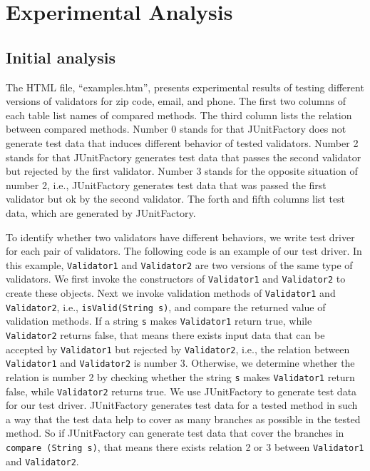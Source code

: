 \section{Experimental Analysis}
\label{Experimental}

\subsection{Initial analysis}

The HTML file, ``examples.htm'',  presents experimental results of testing different versions of validators for zip code, email, and phone. The first two columns of each table list names of compared methods. The third column lists the relation between compared methods. Number 0 stands for that JUnitFactory does not generate test data that induces different behavior of tested validators. Number 2 stands for that JUnitFactory generates test data that passes the second validator but rejected by the first validator. Number 3 stands for the opposite situation of number 2, i.e.,  JUnitFactory generates test data that was passed the first validator but ok by the second validator. The forth and fifth columns list test data, which are generated by JUnitFactory.

To identify whether two validators have different behaviors, we write test driver for each pair of validators. The following code is an example of our test driver. In this example, \verb|Validator1| and \verb|Validator2| are two versions of the same type of validators. We first invoke the constructors of \verb|Validator1| and \verb|Validator2| to create these objects. Next we invoke validation methods of \verb|Validator1| and \verb|Validator2|, i.e., \verb|isValid(String s)|, and compare the returned value of validation methods. If a string \verb|s| makes \verb|Validator1| return true, while  \verb|Validator2| returns false, that means there exists input data that can be accepted by \verb|Validator1| but rejected by \verb|Validator2|, i.e., the relation between \verb|Validator1| and \verb|Validator2| is number 3. Otherwise, we determine whether the relation is number 2 by checking whether the string \verb|s| makes \verb|Validator1| return false, while  \verb|Validator2| returns true. We use JUnitFactory to generate test data for our test driver. JUnitFactory generates test data for a tested method in such a way that the test data help to cover as many branches as possible in the tested method. So if JUnitFactory can generate test data that cover the branches in \verb|compare (String s)|, that means there exists relation 2 or 3 between \verb|Validator1| and \verb|Validator2|.


